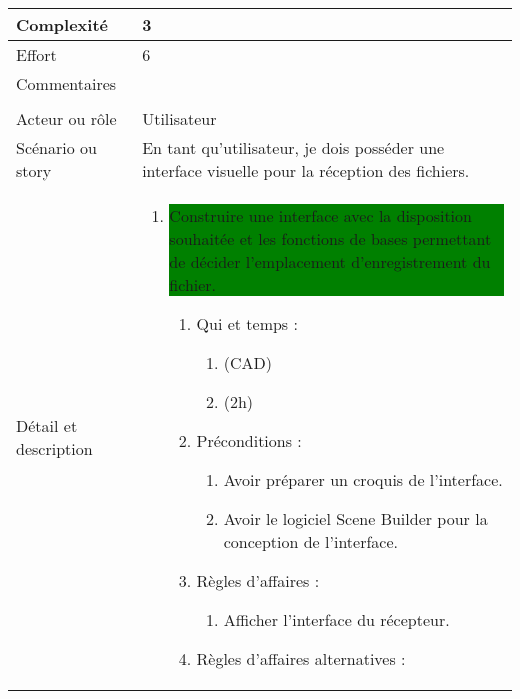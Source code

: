 \begin{longtable}{|l|p{}|}
\hline
    Complexité & 3 \\
\hline
    Effort & 6 \\
\hline
    Commentaires & \\

\hline
    \rowcolor{Gray}
    \multicolumn{2}{|l|}{2} \\
\hline
    Acteur ou rôle & Utilisateur \\
\hline
    Scénario ou story & En tant qu’utilisateur, je dois posséder une interface visuelle pour la réception des fichiers. \\
\hline
    Détail et description &
        \begin{enumerate}[label*=\arabic*.]
            \item \colorbox{Green}{\parbox{13cm}{Construire une interface avec la disposition souhaitée et les fonctions de bases permettant de décider l’emplacement d’enregistrement du fichier.}}
                \begin{enumerate}[label*=\arabic*.]
                                \item Qui et temps :
                                \begin{enumerate}[label*=\arabic*.]
                                    \item (CAD)
                                    \item (2h)
                                \end{enumerate}
                                \item Préconditions :
                                \begin{enumerate}[label*=\arabic*.]
                                    \item Avoir préparer un croquis de l'interface.
                                    \item Avoir le logiciel Scene Builder pour la conception de l'interface.
                                \end{enumerate}
                                \item Règles d'affaires :
                                \begin{enumerate}[label*=\arabic*.]
                                    \item Afficher l'interface du récepteur.
                                \end{enumerate}
                                \item Règles d'affaires alternatives :
                                \begin{enumerate}[label*=\arabic*.]

\end{enumerate}
\end{enumerate}
\end{enumerate}
\end{longtable}
